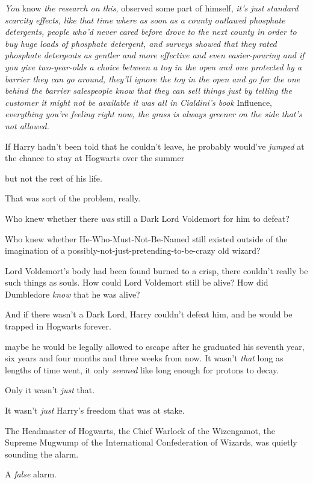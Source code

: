 \emph{You} know \emph{the research on this,} observed some part of himself,
\emph{it's just standard scarcity effects, like that time where as soon as a
county outlawed phosphate detergents, people who'd never cared before drove to
the next county in order to buy huge loads of phosphate detergent, and surveys
showed that they rated phosphate detergents as gentler and more effective and
even easier-pouring{\el} and if you give two-year-olds a choice between a
toy in the open and one protected by a barrier they can go around, they'll
ignore the toy in the open and go for the one behind the barrier{\el}
salespeople know that they can sell things just by telling the customer it
might not be available{\el} it was all in Cialdini's book} Influence,
\emph{everything you're feeling right now, the grass is always greener on the side
that's not allowed.}

If Harry hadn't been told that he couldn't leave, he probably would've
\emph{jumped} at the chance to stay at Hogwarts over the summer{\el}

{\el} but not the rest of his life.

That was sort of the problem, really.

Who knew whether there \emph{was} still a Dark Lord Voldemort for him to defeat?

Who knew whether He-Who-Must-Not-Be-Named still existed outside of the
imagination of a possibly-not-just-pretending-to-be-crazy old wizard?

Lord Voldemort's body had been found burned to a crisp, there couldn't really
be such things as souls. How could Lord Voldemort still be alive? How did
Dumbledore \emph{know} that he was alive?

And if there wasn't a Dark Lord, Harry couldn't defeat him, and he would be
trapped in Hogwarts forever.

{\el} maybe he would be legally allowed to escape after he graduated his
seventh year, six years and four months and three weeks from now. It wasn't
\emph{that} long as lengths of time went, it only \emph{seemed} like long
enough for protons to decay.

Only it wasn't \emph{just} that.

It wasn't \emph{just} Harry's freedom that was at stake.

The Headmaster of Hogwarts, the Chief Warlock of the Wizengamot, the Supreme
Mugwump of the International Confederation of Wizards, was quietly sounding the
alarm.

A \emph{false} alarm.


